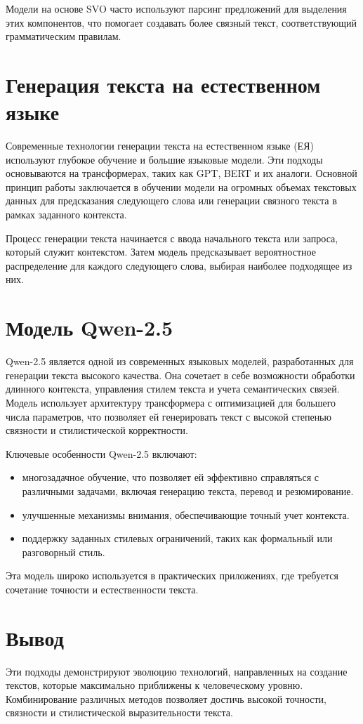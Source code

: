 Модели на основе SVO часто используют парсинг предложений для выделения этих компонентов, 
что помогает создавать более связный текст, соответствующий грамматическим правилам.

\section{Генерация текста на естественном языке}
Современные технологии генерации текста на естественном языке (ЕЯ) используют глубокое обучение и большие языковые модели. 
Эти подходы основываются на трансформерах, таких как GPT, BERT и их аналоги. 
Основной принцип работы заключается в обучении модели на огромных объемах текстовых данных для предсказания следующего слова 
или генерации связного текста в рамках заданного контекста. 

Процесс генерации текста начинается с ввода начального текста или запроса, который служит контекстом. 
Затем модель предсказывает вероятностное распределение для каждого следующего слова, выбирая наиболее подходящее из них. 

\section{Модель Qwen-2.5}
Qwen-2.5 является одной из современных языковых моделей, разработанных для генерации текста высокого качества. 
Она сочетает в себе возможности обработки длинного контекста, управления стилем текста и учета семантических связей. 
Модель использует архитектуру трансформера с оптимизацией для большего числа параметров, что позволяет ей генерировать текст 
с высокой степенью связности и стилистической корректности.

Ключевые особенности Qwen-2.5 включают:
\begin{itemize}
    \item многозадачное обучение, что позволяет ей эффективно справляться с различными задачами, включая генерацию текста, перевод и резюмирование.
    \item улучшенные механизмы внимания, обеспечивающие точный учет контекста.
    \item поддержку заданных стилевых ограничений, таких как формальный или разговорный стиль.
\end{itemize}

Эта модель широко используется в практических приложениях, где требуется сочетание точности и естественности текста.

\section*{Вывод}

Эти подходы демонстрируют эволюцию технологий, направленных на создание текстов, которые максимально приближены к человеческому уровню. 
Комбинирование различных методов позволяет достичь высокой точности, связности и стилистической выразительности текста.

\clearpage